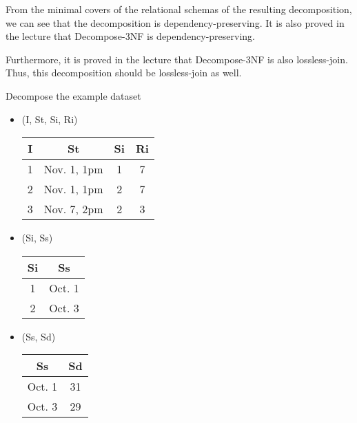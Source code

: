 \documentclass[12pt]{article}
\begin{document}
\begin{enumerate}
        From the minimal covers of the relational schemas of the resulting
        decomposition, we can see that the decomposition is
        dependency-preserving. It is also proved in the lecture that
        Decompose-3NF is dependency-preserving.

        Furthermore, it is proved in the lecture that Decompose-3NF is also
        lossless-join. Thus, this decomposition should be lossless-join as well.

        Decompose the example dataset
        \begin{itemize}
          \item (I, St, Si, Ri)
                \begin{center}
                  \begin{tabular}{ c c c c }
                    \hline
                    I & St           & Si & Ri \\
                    \hline
                    1 & Nov. 1, 1pm  & 1  & 7  \\
                    2 & Nov. 1, 1pm  & 2  & 7  \\
                    3 & Nov. 7, 2pm  & 2  & 3  \\
                    \hline
                  \end{tabular}
                \end{center}
          \item (Si, Ss)
                \begin{center}
                  \begin{tabular}{c c}
                    \hline
                    Si & Ss \\
                    \hline
                    1  & Oct. 1 \\
                    2  & Oct. 3 \\
                    \hline
                  \end{tabular}
                \end{center}
          \item (Ss, Sd)
                \begin{center}
                  \begin{tabular}{c c}
                    \hline
                    Ss     & Sd \\
                    \hline
                    Oct. 1 & 31 \\
                    Oct. 3 & 29 \\
                    \hline                    

\end{tabular}
\end{center}
\end{itemize}
\end{enumerate}
\end{document}
